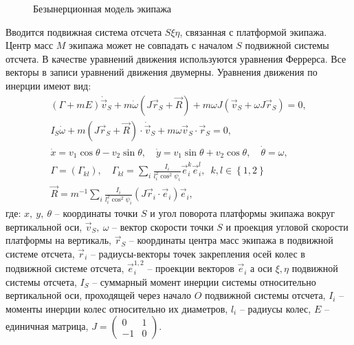 \begin{figure}[ht!]
    \centering
    \caption{Безынерционная модель экипажа}
    \label{fig:bor_vehicle}
\end{figure}

Вводится подвижная система отсчета $S\xi\eta$, связанная с платформой экипажа. Центр масс $M$ экипажа может не совпадать с началом $S$ подвижной системы отсчета. В качестве уравнений движения используются уравнения Феррерса. Все векторы в записи уравнений движения двумерны. Уравнения движения по инерции имеют вид:
\begin{eqnarray}\label{eq:bor}
    (\Gamma+mE)\dot{\vec{v}}_S + m\dot{\omega}(J\vec{r}_S+\vec{R})+m\omega J(\vec{v}_S + \omega J\vec{r}_S) = 0,\\
    I_S\dot{\omega} + m(J\vec{r}_S+\vec{R})\cdot\dot{\vec{v}}_S+m\omega\vec{v}_S\cdot\vec{r}_S = 0,\\
    \dot{x} = v_1\cos\theta - v_2\sin\theta, \quad \dot{y} = v_1\sin\theta + v_2\cos\theta, \quad \dot{\theta} = \omega,\\
    \Gamma = \left( \Gamma_{kl} \right), \quad \Gamma_{kl} = \sum_i \frac{I_i}{l_i^2 \cos^2\psi_i}\vec{e}_i^k\vec{e}_i^l, \enspace k,l \in \left\{ 1, 2 \right\} \\
    \vec{R} = m^{-1}\sum_i \frac{I_i}{l_i^2 \cos^2\psi_i}(J\vec{r}_i\cdot \vec{e}_i) \vec{e}_i,
\end{eqnarray}
где: \newline
$x, \ y, \ \theta$ -- координаты точки $S$ и угол поворота платформы экипажа вокруг вертикальной оси,\newline
$\vec{v}_S, \ \omega$ -- вектор скорости точки $S$ и проекция угловой скорости платформы на вертикаль,\newline
$\vec{r}_S$ -- координаты центра масс экипажа в подвижной системе отсчета,\newline
$\vec{r}_i$ -- радиусы-векторы точек закрепления осей колес в подвижной системе отсчета,\newline
$\vec{e}_i^{1,2}$ -- проекции векторов $\vec{e}_i$ а оси $\xi,\eta$ подвижной системы отсчета,\newline
$I_S$ -- суммарный момент инерции системы относительно вертикальной оси, проходящей через начало $O$ подвижной системы отсчета,\newline
$I_i$ -- моменты инерции колес относительно их диаметров,\newline
$l_i$ -- радиусы колес,\newline
$E$ -- единичная матрица,
$J = \left(\begin{array}{cc}0 & 1\\-1 & 0\end{array}\right)$.

